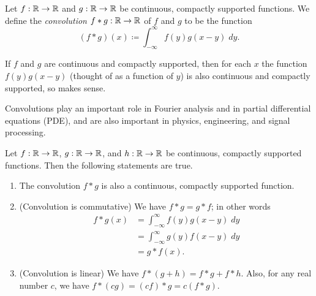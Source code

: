 \begin{defn}[Convolution]\label{ii:3.8.9}
  Let \(f : \mathbb{R} \to \mathbb{R}\) and \(g : \mathbb{R} \to \mathbb{R}\) be continuous, compactly supported functions.
  We define the \emph{convolution} \(f * g : \mathbb{R} \to \mathbb{R}\) of \(f\) and \(g\) to be the function
  \[
    (f * g)(x) \coloneqq \int_{-\infty}^\infty f(y) g(x - y) \; dy.
  \]
\end{defn}

\begin{note}
  If \(f\) and \(g\) are continuous and compactly supported, then for each \(x\) the function \(f(y) g(x - y)\) (thought of as a function of \(y\)) is also continuous and compactly supported, so  makes sense.
\end{note}

\begin{rmk}\label{ii:3.8.10}
  Convolutions play an important role in Fourier analysis and in partial differential equations (PDE), and are also important in physics, engineering, and signal processing.
\end{rmk}

\begin{prop}\label{ii:3.8.11}
  Let \(f : \mathbb{R} \to \mathbb{R}\), \(g : \mathbb{R} \to \mathbb{R}\), and \(h : \mathbb{R} \to \mathbb{R}\) be continuous, compactly supported functions.
  Then the following statements are true.
  \begin{enumerate}
    \item\label{ii:3.8.11.a} The convolution \(f * g\) is also a continuous, compactly supported function.
    \item\label{ii:3.8.11.b} (Convolution is commutative)
    We have \(f * g = g * f\);
    in other words
    \begin{align*}
      f * g(x) & = \int_{-\infty}^\infty f(y) g(x - y) \; dy \\
               & = \int_{-\infty}^\infty g(y) f(x - y) \; dy \\
               & = g * f(x).
    \end{align*}
    \item\label{ii:3.8.11.c} (Convolution is linear)
    We have \(f * (g + h) = f * g + f * h\).
    Also, for any real number \(c\), we have \(f * (cg) = (cf) * g = c(f * g)\).
  \end{enumerate}
\end{prop}

